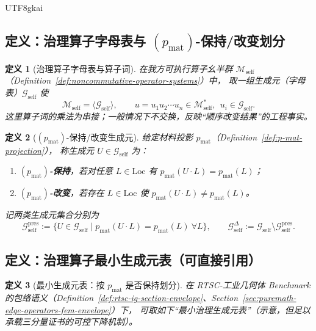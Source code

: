 \documentclass[12pt]{article}
\newtheorem{definition}{定义}[section]
\newcommand{\RTSC}{\textsf{RTSC}}
\begin{document}
\begin{CJK*}{UTF8}{gkai}
\subsection{定义：治理算子字母表与 $(p_{\mathrm{mat}})$-保持/改变划分}

\begin{definition}[治理算子字母表与算子词]
\label{def:governance-operator-alphabet}
在我方可执行算子幺半群 $\mathcal{M}_{\mathrm{self}}$（Definition~\ref{def:noncommutative-operator-systems}）中，
取一组生成元（字母表）$\mathcal{G}_{\mathrm{self}}$ 使
\[
\mathcal{M}_{\mathrm{self}}=\langle \mathcal{G}_{\mathrm{self}}\rangle,
\qquad
u=u_1u_2\cdots u_n\in \mathcal{M}_{\mathrm{self}}^\ast,\ \ u_i\in\mathcal{G}_{\mathrm{self}}.
\]
这里算子词的乘法为串接；一般情况下不交换，反映“顺序改变结果”的工程事实。
\end{definition}

\begin{definition}[$(p_{\mathrm{mat}})$-保持/改变生成元]
\label{def:p-mat-preserve-change-generators}
给定材料投影 $p_{\mathrm{mat}}$（Definition~\ref{def:p-mat-projection}），
称生成元 $U\in\mathcal{G}_{\mathrm{self}}$ 为：
\begin{enumerate}
  \item \textbf{$(p_{\mathrm{mat}})$-保持}，若对任意 $L\in\mathrm{Loc}$ 有 $p_{\mathrm{mat}}(U\cdot L)=p_{\mathrm{mat}}(L)$；
  \item \textbf{$(p_{\mathrm{mat}})$-改变}，若存在 $L\in\mathrm{Loc}$ 使 $p_{\mathrm{mat}}(U\cdot L)\neq p_{\mathrm{mat}}(L)$。
\end{enumerate}
记两类生成元集合分别为
\[
\mathcal{G}_{\mathrm{self}}^{\mathrm{pres}}
:=
\{U\in\mathcal{G}_{\mathrm{self}}\mid p_{\mathrm{mat}}(U\cdot L)=p_{\mathrm{mat}}(L)\ \forall L\},
\qquad
\mathcal{G}_{\mathrm{self}}^{\Delta}
:=
\mathcal{G}_{\mathrm{self}}\setminus \mathcal{G}_{\mathrm{self}}^{\mathrm{pres}}.
\]
\end{definition}

\subsection{定义：治理算子最小生成元表（可直接引用）}

\begin{definition}[最小生成元表：按 $p_{\mathrm{mat}}$ 是否保持划分]
\label{def:governance-generators-minimal-table}
在 \RTSC{}-工业几何体 Benchmark 的包络语义（Definition~\ref{def:rtsc-ig-section-envelope}、Section~\ref{sec:puremath-edge-operators-fem-envelope}）下，
可取如下“最小治理生成元表”（示意，但足以承载三分量证书的可控下降机制）。


\end{definition}
\end{CJK*}
\end{document}
